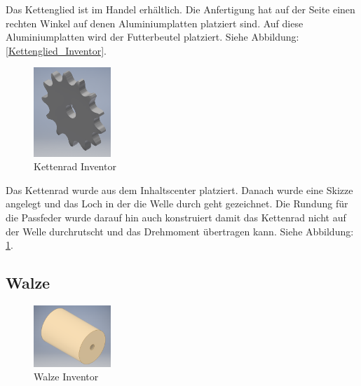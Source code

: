 Das Kettenglied ist im Handel erhältlich. Die Anfertigung hat auf der Seite einen rechten Winkel auf denen Aluminiumplatten platziert sind. Auf diese Aluminiumplatten wird der Futterbeutel platziert. Siehe Abbildung: \ref{Kettenglied_Inventor}.\\

\begin{figure}
\vspace{-20pt}
  \begin{center}
    \includegraphics[width=0.26\textwidth]{Bilder/Inventor/Kettenrad}
  \end{center}
  \caption{Kettenrad Inventor}
  \label{Kettenrad_Inventor}
  \vspace{-30pt}
\end{figure}

Das Kettenrad wurde aus dem Inhaltscenter platziert. Danach wurde eine Skizze angelegt und das Loch in der die Welle durch geht gezeichnet. Die Rundung für die Passfeder wurde darauf hin auch konstruiert damit das Kettenrad nicht auf der Welle durchrutscht und das Drehmoment übertragen kann. Siehe Abbildung: \ref{Kettenrad_Inventor}.
\newpage

\subsection{Walze}

\begin{figure}
\vspace{-20pt}
  \begin{center}
    \includegraphics[width=0.26\textwidth]{Bilder/Inventor/Rolle}
  \end{center}
  \caption{Walze Inventor}
  \label{Walze_Inventor}
  \vspace{-30pt}
\end{figure}

